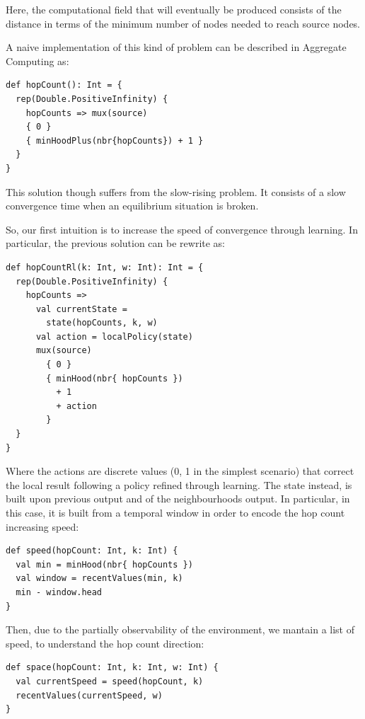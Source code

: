\documentclass[conference]{IEEEtran}
\newcommand{\todos}[1]{\todo[inline, color=cyan]{\textbf{TODO}: #1}}
\begin{document}
Here, the computational field that will eventually be produced consists of the distance in terms of the minimum number of nodes needed to reach source nodes.

A naive implementation of this kind of problem can be described in Aggregate Computing as:
\begin{verbatim}
def hopCount(): Int = {
  rep(Double.PositiveInfinity) { 
    hopCounts => mux(source) 
    { 0 } 
    { minHoodPlus(nbr{hopCounts}) + 1 }
  }
}
\end{verbatim}
This solution though suffers from the slow-rising problem. 
 It consists of a slow convergence time when an equilibrium situation is broken. 
\todos{expand with examples}

So, our first intuition is to increase the speed of convergence through learning. 
 In particular, the previous solution can be rewrite as:

 \begin{verbatim}
def hopCountRl(k: Int, w: Int): Int = {
  rep(Double.PositiveInfinity) { 
    hopCounts => 
      val currentState = 
        state(hopCounts, k, w)
      val action = localPolicy(state)
      mux(source) 
        { 0 } 
        { minHood(nbr{ hopCounts }) 
          + 1 
          + action
        } 
  }
}
\end{verbatim}

Where the actions are discrete values (0, 1 in the simplest scenario) that correct the local result following a policy refined through learning.
%
The state instead, is built upon previous output and of the neighbourhoods output.
 In particular, in this case, it is built from a temporal window in order to encode the hop count increasing speed:
\begin{verbatim}
def speed(hopCount: Int, k: Int) {
  val min = minHood(nbr{ hopCounts })
  val window = recentValues(min, k)
  min - window.head 
}
\end{verbatim}
Then, due to the partially observability of the environment, we mantain a 
 list of speed, to understand the hop count direction:

 \begin{verbatim}
def space(hopCount: Int, k: Int, w: Int) {
  val currentSpeed = speed(hopCount, k)
  recentValues(currentSpeed, w)
}
\end{verbatim}
\end{document}

